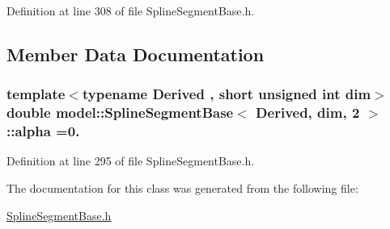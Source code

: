 Definition at line 308 of file Spline\+Segment\+Base.\+h.



\subsection{Member Data Documentation}
\hypertarget{classmodel_1_1_spline_segment_base_3_01_derived_00_01dim_00_012_01_4_a2e07f885d068811da66921e1dbf9bcb8}{}
\subsubsection[{alpha}]{\setlength{\rightskip}{0pt plus 5cm}template$<$typename Derived , short unsigned int dim$>$ double {\bf model\+::\+Spline\+Segment\+Base}$<$ Derived, {\bf dim}, 2 $>$\+::alpha =0.\hspace{0.3cm}{\ttfamily [static]}}\label{classmodel_1_1_spline_segment_base_3_01_derived_00_01dim_00_012_01_4_a2e07f885d068811da66921e1dbf9bcb8}


Definition at line 295 of file Spline\+Segment\+Base.\+h.



The documentation for this class was generated from the following file\+:\begin{DoxyCompactItemize}
\item 
\hyperlink{_spline_segment_base_8h}{Spline\+Segment\+Base.\+h}\end{DoxyCompactItemize}
